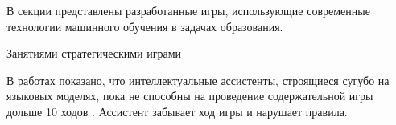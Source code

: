 В секции представлены разработанные игры, использующие современные технологии машинного обучения в задачах образования.

Занятиями стратегическими играми \cite{burgoyne2016relationship}\cite{wheaton2011teaching}

В работах показано, что интеллектуальные ассистенты, строящиеся сугубо на языковых моделях, пока не способны на проведение содержательной игры дольше 10 ходов
. Ассистент забывает ход игры и нарушает правила.


